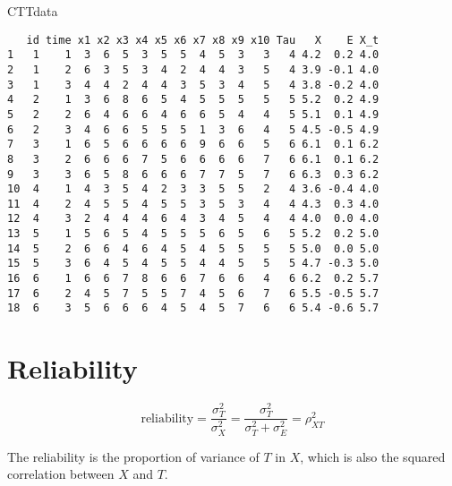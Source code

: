 \documentclass[
]{book}
\newenvironment{Shaded}{\begin{snugshade}}{\end{snugshade}}
\newcommand{\NormalTok}[1]{#1}
\newcommand{\OtherTok}[1]{\textcolor[rgb]{0.56,0.35,0.01}{#1}}
\newcommand{\SpecialCharTok}[1]{\textcolor[rgb]{0.00,0.00,0.00}{#1}}
\begin{document}
\begin{Shaded}
\begin{Highlighting}[]
\NormalTok{CTTdata}
\end{Highlighting}
\end{Shaded}

\begin{verbatim}
   id time x1 x2 x3 x4 x5 x6 x7 x8 x9 x10 Tau   X    E X_t
1   1    1  3  6  5  3  5  5  4  5  3   3   4 4.2  0.2 4.0
2   1    2  6  3  5  3  4  2  4  4  3   5   4 3.9 -0.1 4.0
3   1    3  4  4  2  4  4  3  5  3  4   5   4 3.8 -0.2 4.0
4   2    1  3  6  8  6  5  4  5  5  5   5   5 5.2  0.2 4.9
5   2    2  6  4  6  6  4  6  6  5  4   4   5 5.1  0.1 4.9
6   2    3  4  6  6  5  5  5  1  3  6   4   5 4.5 -0.5 4.9
7   3    1  6  5  6  6  6  6  9  6  6   5   6 6.1  0.1 6.2
8   3    2  6  6  6  7  5  6  6  6  6   7   6 6.1  0.1 6.2
9   3    3  6  5  8  6  6  6  7  7  5   7   6 6.3  0.3 6.2
10  4    1  4  3  5  4  2  3  3  5  5   2   4 3.6 -0.4 4.0
11  4    2  4  5  5  4  5  5  3  5  3   4   4 4.3  0.3 4.0
12  4    3  2  4  4  4  6  4  3  4  5   4   4 4.0  0.0 4.0
13  5    1  5  6  5  4  5  5  5  6  5   6   5 5.2  0.2 5.0
14  5    2  6  6  4  6  4  5  4  5  5   5   5 5.0  0.0 5.0
15  5    3  6  4  5  4  5  5  4  4  5   5   5 4.7 -0.3 5.0
16  6    1  6  6  7  8  6  6  7  6  6   4   6 6.2  0.2 5.7
17  6    2  4  5  7  5  5  7  4  5  6   7   6 5.5 -0.5 5.7
18  6    3  5  6  6  6  4  5  4  5  7   6   6 5.4 -0.6 5.7
\end{verbatim}

\hypertarget{reliability}{%
\section{Reliability}\label{reliability}}

\[
\text{reliability} = \frac{\sigma^2_T}{\sigma^2_X} = \frac{\sigma^2_T}{\sigma^2_T + \sigma^2_E} = \rho^2_{XT}
\]

The reliability is the proportion of variance of \(T\) in \(X\), which is also the squared correlation between \(X\) and \(T\).

\begin{Shaded}
\end{Shaded}
\end{document}
